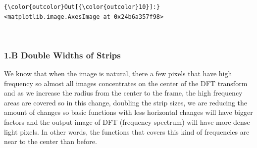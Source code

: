 \documentclass[11pt]{article}
\begin{document}
\begin{Verbatim}[commandchars=\\\{\}]
{\color{outcolor}Out[{\color{outcolor}10}]:} <matplotlib.image.AxesImage at 0x24b6a357f98>
\end{Verbatim}
            
    \begin{center}
    \end{center}
    { \hspace*{\fill} \\}
    
    \hypertarget{b-double-widths-of-strips}{%
\subsubsection{1.B Double Widths of
Strips}\label{b-double-widths-of-strips}}

We know that when the image is natural, there a few pixels that have
high frequency so almost all images concentrates on the center of the
DFT transform and as we increase the radius from the center to the
frame, the high frequency areas are covered so in this change, doubling
the strip sizes, we are reducing the amount of changes so basic
functions with less horizontal changes will have bigger factors and the
output image of DFT (frequency spectrum) will have more dense light
pixels. In other words, the functions that covers this kind of
frequencies are near to the center than before.
\end{document}
